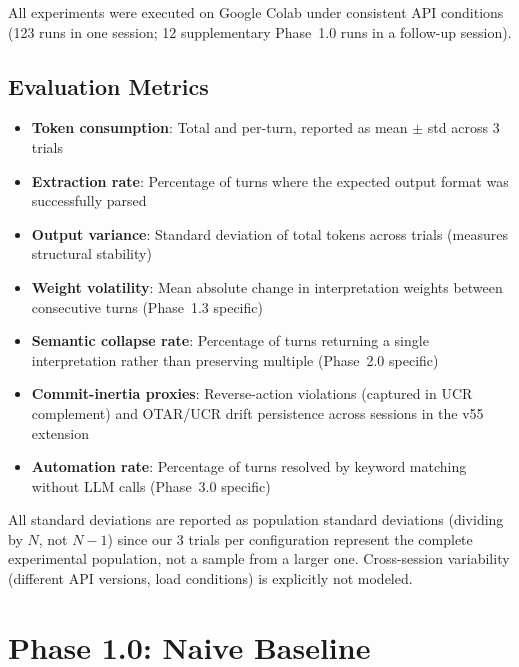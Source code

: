 \documentclass[11pt,a4paper]{article}
\begin{document}
All experiments were executed on Google Colab under consistent API conditions
(123 runs in one session; 12 supplementary Phase~1.0 runs in a follow-up session).

\subsection{Evaluation Metrics}

\begin{itemize}
    \item \textbf{Token consumption}: Total and per-turn, reported as mean $\pm$ std
    across 3 trials
    \item \textbf{Extraction rate}: Percentage of turns where the expected output
    format was successfully parsed
    \item \textbf{Output variance}: Standard deviation of total tokens across trials
    (measures structural stability)
    \item \textbf{Weight volatility}: Mean absolute change in interpretation weights
    between consecutive turns (Phase~1.3 specific)
    \item \textbf{Semantic collapse rate}: Percentage of turns returning a single
    interpretation rather than preserving multiple (Phase~2.0 specific)
    \item \textbf{Commit-inertia proxies}: Reverse-action violations (captured in
    UCR complement) and OTAR/UCR drift persistence across sessions in the v55 extension
    \item \textbf{Automation rate}: Percentage of turns resolved by keyword matching
    without LLM calls (Phase~3.0 specific)
\end{itemize}

\noindent All standard deviations are reported as population standard deviations
(dividing by $N$, not $N{-}1$) since our 3 trials per configuration represent
the complete experimental population, not a sample from a larger one.
Cross-session variability (different API versions, load conditions) is
explicitly not modeled.

\section{Phase 1.0: Naive Baseline}
\label{sec:phase1_0}
\end{document}
